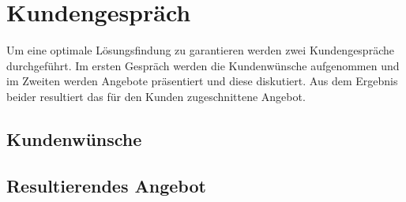 \documentclass{article}
\begin{document}
\section{Kundengespräch}
Um eine optimale Lösungsfindung zu garantieren werden zwei Kundengespräche durchgeführt. Im ersten Gespräch werden die Kundenwünsche aufgenommen und im Zweiten werden Angebote präsentiert und diese diskutiert. Aus dem Ergebnis beider resultiert das für den Kunden zugeschnittene Angebot. 
\subsection{Kundenwünsche}
\subsection{Resultierendes Angebot}
\end{document}
